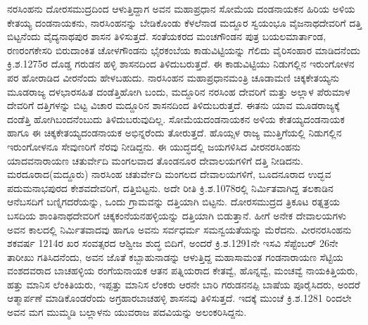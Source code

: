 ನರಸಿಂಹನು ದೋರಸಮುದ್ರದಿಂದ ಆಳುತ್ತಿದ್ದಾಗ ಅವನ ಮಹಾಪ್ರಧಾನ ಸೋಮೆಯ ದಂಡನಾಯಕನ ಹಿರಿಯ ಅಳಿಯ ಕೇತಯ್ಯ ದಂಡನಾಯಕನು, ನಾರಸಿಂಹನನ್ನು ಬೇಡಿಕೊಂಡು ಕೆಳಲೆನಾಡ ಮದ್ದೂರ ಸ್ವಯಂಭೂ ವೈಜನಾಥದೇವರಿಗೆ ದತ್ತಿ ಬಿಟ್ಟನೆಂದು ವೈದ್ಯನಾಥಪುರ ಶಾಸನ ತಿಳಿಸುತ್ತದೆ. ಸಂತೆಯಕರದ ಮಂಚಗೌಂಡನ ಪುತ್ರ ಬಯಲಮಾರ್ತಾಂಡ, ರಣರಂಗಕೇಸರಿ ಬಿರುದಾಂಕಿತ ಚೋಳಗೌಂಡನು ಭೈರಕಂಬೆಯ ಕಾಡುವಿಟ್ಟಿಯನ್ನು ಗೆಲಿದು ವೈರಿಸಂಹಾರ ಮಾಡಿದನೆಂದು ಕ್ರಿ.ಶ.1275ರ ದೊಡ್ಡ ಗರುಡನ ಹಳ್ಳಿ ಶಾಸನದಿಂದ ತಿಳಿದುಬರುತ್ತದೆ. ಈ ಕಾಡುವಿಟ್ಟಿಯು ನಿಡುಗಲ್ಲಿನ ಇರುಂಗೋಳನ ಪರ ಹೋರಾಡಿದ ವೀರನೆಂದು ಹೇಳಬಹುದು. ನಾರಸಿಂಹನ ಮಹಾಪ್ರಧಾನಮಂತ್ರಿ ಚೂಡಾಮಣಿ ಚಿಕ್ಕಕೇತಯ್ಯನು ಮೂಡರಾಜ್ಯ ದಳಭಾರಸಹಿತ ದಂಡೆತ್ತಿಹೋಗಿ ಬಂದು, ಮದ್ದೂರಿನ ನರಸಿಂಹ ದೇವರಿಗೆ ಮತ್ತು ಅಲ್ಲಾಳ ಪೆರುಮಾಳ ದೇವರಿಗೆ ದತ್ತಿಗಳನ್ನು ಬಿಟ್ಟ ವಿಚಾರ ಮದ್ದೂರಿನ ಶಾಸನದಿಂದ ತಿಳಿದುಬರುತ್ತದೆ. ಈತನು ಯಾವ ಮೂಡರಾಜ್ಯಕ್ಕೆ ದಂಡೆತ್ತಿ ಹೋಗಿಬಂದನೆಂಬುದು ತಿಳಿದು\-ಬರುವುದಿಲ್ಲ. ಸೋಮೆಯದಂಡನಾಯಕನ ಅಳಿಯ ಕೇತಯ್ಯದಂಡನಾಯಕ ಹಾಗೂ ಈ ಚಿಕ್ಕಕೇತಯ್ಯದಂಡನಾಯಕ ಅಭಿನ್ನರೆಂದು ತೋರುತ್ತದೆ. ಹೊಯ್ಸಳ ರಾಜ್ಯ ಮುತ್ತಿಗೆಯಲ್ಲಿ ನಿಡುಗಲ್ಲಿನ ಇರುಂಗೋಳನೂ ಸೇವುಣರಿಗೆ ನೆರವು ನೀಡಿದ್ದನು. ಈ ಯುದ್ಧದಲ್ಲಿ ಜಯಗಳಿಸಿದ ವೀರನರಸಿಂಹನು ಯಾದವನಾರಾಯಣ ಚತುರ್ವೇದಿ ಮಂಗಲವಾದ ತೊಂಡನೂರ ದೇವಾಲಯಗಳಿಗೆ ದತ್ತಿ ನೀಡಿದನು. ಮರದೂರಾದ(ಮದ್ದೂರು) ನಾರಸಿಂಹ ಚತುರ್ವೇದಿ ಮಂಗಲದ ದೇವಾಲಯಗಳಿಗೆ, ಬೂದನೂರಾದ ಉದ್ಭವ ಪದುಮನಾಭಪುರದ ಕೇಶವದೇವರಿಗೆ, ದತ್ತಿಬಿಟ್ಟನು. ಅದೇ ರೀತಿ ಕ್ರಿ.ಶ.1078ರಲ್ಲಿ ನಿರ್ಮಿತವಾಗಿದ್ದ ತಲಕಾಡಿನ ಆನೆಬಸದಿಗೆ ಬಣ್ನಿಗದರೆಯನ್ನು, ಒಂದು ಗ್ರಾಮವನ್ನು ದತ್ತಿಯಾಗಿ ಬಿಟ್ಟನು. ದೋರಸಮುದ್ರದ ತ್ರಿಕೂಟ ರತ್ನತ್ರಯ ಬಸದಿಯ ಶಾಂತಿನಾಥದೇವರಿಗೆ ಚಿಕ್ಕಕಂನೆಯನಹಳ್ಳಿಯನ್ನು ದತ್ತಿಯಾಗಿ ಬಿಡುತ್ತಾನೆ. ಹೀಗೆ ಅನೇಕ ದೇವಾಲಯಗಳು ಅವನ ಕಾಲದಲ್ಲಿ ನಿರ್ಮಿತವಾದವು ಹಾಗೂ ಅವನು ಸರ್ವಧರ್ಮ ಸಮನ್ವಯತೆಯನ್ನು ಮೆರೆದನು. ವೀರನರಸಿಂಹನು ಶಕವರ್ಷ 1214ರ ಖರ ಸಂವತ್ಸರದ ಆಶ್ವೀಜ ಶುದ್ಧ ಬಿದಿಗೆ, ಅಂದರೆ ಕ್ರಿ.ಶ.1291ನೇ ಇಸವಿ ಸೆಪ್ಟೆಂಬರ್​ 26ನೇ ತಾರೀಖು ಗತಿಸಿದನೆಂದು, ಅವನ ಜೊತೆ ಕಬ್ಬಾಹುನಾಡನ್ನು ಆಳುತ್ತಿದ್ದ ಮಹಾಸಾಮಂತ ಗಂಡನಾರಾಯಣ ಸೆಟ್ಟಿಯ ವಂಶದವರಾದ ಬಾಚಹಳ್ಳಿಯ ರಂಗೆಯನಾಯಕ ಆತನ ಪತ್ನಿಯರಾದ ಕೇತವ್ವೆ, ಹೊನ್ನವ್ವೆ, ಮಂಚವ್ವೆ ನಾಯಕಿತ್ತಿಯರು, ಹತ್ತು ಮಾನಿಸ ಲೆಂಕಿತಿಯರು, ಇಪ್ಪತ್ತು ಮಾನಿಸ ಲೆಂಕರು ಆರನೇ ಬಾರಿ ಗರುಡನನಪ್ಪಿ ಬಾಷೆಯ ಪೂರೈಸಿದರು, ಅಂದರೆ ಆತ್ಮಾರ್ಪಣೆ ಮಾಡಿಕೊಂಡರೆಂದು ಅಗ್ರಹಾರಬಾಚಹಳ್ಳಿ ಶಾಸನವು ತಿಳಿಸುತ್ತದೆ. ಇದಕ್ಕೆ ಮುಂಚೆ ಕ್ರಿ.ಶ.1281 ರಿಂದಲೇ ಅವನ ಮಗ ಮುಮ್ಮಡಿ ಬಲ್ಲಾಳನು ಯುವರಾಜ ಪದವಿಯನ್ನು ಅಲಂಕರಿಸಿದ್ದನು.


